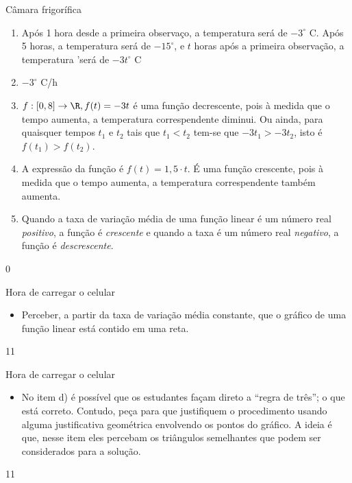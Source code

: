 \begin{answer}{Câmara frigorífica}
{
\begin{enumerate}
\item Após 1 hora desde a primeira observaço, a temperatura será de $-3^{\circ}$ C. Após 5 horas, a temperatura será de $-15^{\circ}$, e $t$ horas após a primeira observação, a temperatura 'será de $-3t^{\circ}$ C

\item $-3^{\circ}$ C/h

\item $f:[0,8]\rightarrow\R, f(t)=-3t$ é uma função decrescente, pois à medida que o tempo aumenta, a temperatura correspendente diminui. Ou ainda, para quaisquer tempos $t_1$ e $t_2$ tais que $t_1<t_2$ tem-se que $-3t_1>-3t_2$, isto é $f(t_1)>f(t_2)$.

\item A expressão da função é $f(t)=1{,}5\cdot t$. É uma função crescente, pois à medida que o tempo aumenta, a temperatura correspendente também aumenta.


\item Quando a taxa de variação média de uma função linear é um número real \textit{positivo}, a função é \textit{crescente} e quando a taxa é um número real \textit{negativo}, a função é \textit{descrescente}.
\end{enumerate}
}{0}
\end{answer}
\clearmargin
\begin{objectives}{Hora de carregar o celular}
{
\begin{itemize}
\item Perceber, a partir da taxa de variação média constante, que o gráfico de uma função linear está contido em uma reta.
\end{itemize}
}{1}{1}
\end{objectives}
\begin{sugestions}{Hora de carregar o celular}
{
\begin{itemize}
\item No item d) é possível que os estudantes façam direto a “regra de três”; o que está correto. Contudo, peça para que justifiquem o procedimento usando alguma justificativa geométrica envolvendo os pontos do gráfico. A ideia é que, nesse item eles percebam os triângulos semelhantes que podem ser considerados para a solução.
\end{itemize}
}{1}{1}
\end{sugestions}
